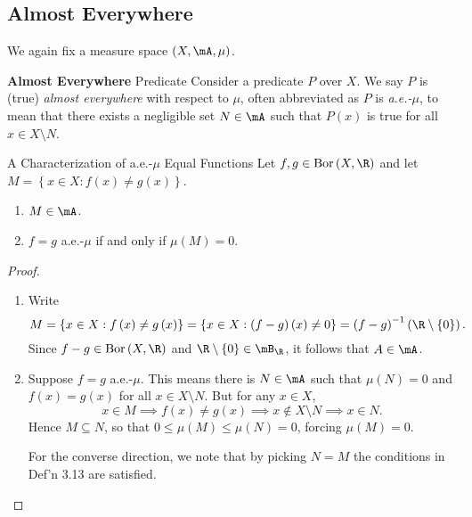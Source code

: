 \documentclass[pmath450]{subfiles}
\begin{document}
    \subsection{Almost Everywhere}

    We again fix a measure space $\left( X,\mA,\mu \right)$.

    \begin{definition}{\textbf{Almost Everywhere} Predicate}
        Consider a predicate $P$ over $X$. We say $P$ is (true) \emph{almost everywhere} with respect to $\mu$, often abbreviated as $P$ is \emph{a.e.-$\mu$}, to mean that there exists a negligible set $N\in\mA$ such that $P\left( x \right)$ is true for all $x\in X\setminus N$.
    \end{definition}
    
    \begin{prop}{A Characterization of a.e.-$\mu$ Equal Functions}
        Let $f,g\in\bor\left( X,\R \right)$ and let $M=\left\lbrace x\in X: f\left( x \right)\neq g\left( x \right) \right\rbrace$.
        \begin{enumerate}
            \item $M\in\mA$.
            \item $f=g$ a.e.-$\mu$ if and only if $\mu\left( M \right)=0$.
        \end{enumerate}
    \end{prop}

    \begin{proof}
        \begin{enumerate}
            \item Write
                \begin{equation*}
                    M = \left\lbrace x\in X: f\left( x \right)\neq g\left( x \right) \right\rbrace = \left\lbrace x\in X: \left( f-g \right)\left( x \right)\neq 0 \right\rbrace = \left( f-g \right)^{-1}\left( \R\setminus \left\lbrace 0 \right\rbrace \right).
                \end{equation*}
                Since $f-g\in\bor\left( X,\R \right)$ and $\R\setminus \left\lbrace 0 \right\rbrace\in\mB_{\R}$, it follows that $A\in\mA$.

            \item Suppose $f=g$ a.e.-$\mu$. This means there is $N\in\mA$ such that $\mu\left( N \right)=0$ and $f\left( x \right)=g\left( x \right)$ for all $x\in X\setminus N$. But for any $x\in X$,
                \begin{equation*}
                    x\in M\implies f\left( x \right)\neq g\left( x \right)\implies x\notin X\setminus N \implies x\in N.
                \end{equation*}
                Hence $M\subseteq N$, so that $0\leq\mu\left( M \right)\leq\mu\left( N \right)=0$, forcing $\mu\left( M \right)=0$.

                For the converse direction, we note that by picking $N=M$ the conditions in Def'n 3.13 are satisfied.
        \end{enumerate}
    \end{proof}
\end{document}
